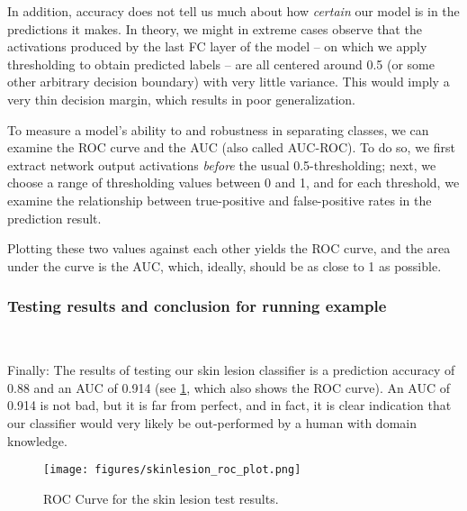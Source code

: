 In addition, accuracy does not tell us much about how \emph{certain} our model is
in the predictions it makes. In theory, we might in extreme cases observe that
the activations produced by the last FC layer of the model -- on which we apply
thresholding to obtain predicted labels -- are all centered around 0.5 (or some
other arbitrary decision boundary) with very little variance. This would imply a
very thin decision margin, which results in poor generalization.

To measure a model's ability to and robustness in separating classes, we can
examine the ROC curve and the AUC (also called AUC-ROC). To do so, we first
extract network output activations \emph{before} the usual 0.5-thresholding;
next, we choose a range of thresholding values between 0 and 1, and for each
threshold, we examine the relationship between true-positive and false-positive
rates in the prediction result.

Plotting these two values against each other yields the ROC curve, and the area
under the curve is the AUC, which, ideally, should be as close to 1 as possible.

\subsubsection{Testing results and conclusion for running example}~

Finally: The results of testing our skin lesion classifier is a prediction
accuracy of 0.88 and an AUC of 0.914 (see \cref{fig:skinlesion_roc}, which also
shows the ROC curve). An AUC of 0.914 is not bad, but it is far from perfect,
and in fact, it is clear indication that our classifier would very likely be
out-performed by a human with domain knowledge.

\begin{figure}
  \centering
  \texttt{[image: figures/skinlesion\_roc\_plot.png]}
  \hspace{1cm}
  \caption{{\footnotesize ROC Curve for the skin lesion test results.}}
\label{fig:skinlesion_roc}
\end{figure}


